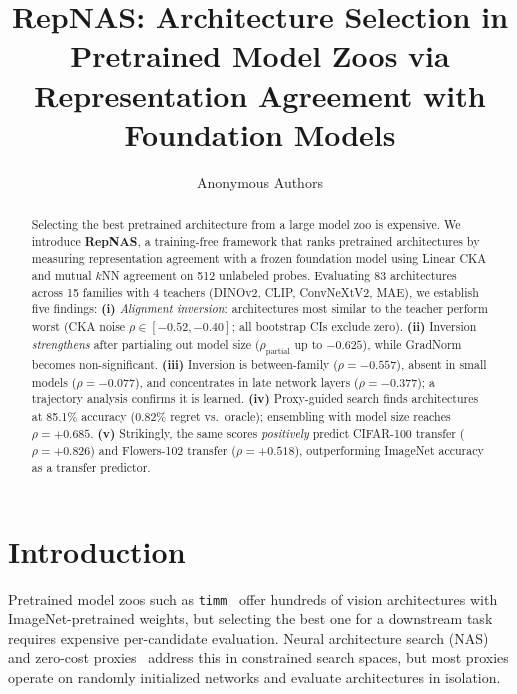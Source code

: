 \documentclass[10pt,twocolumn,letterpaper]{article}
\title{RepNAS: Architecture Selection in Pretrained Model Zoos via Representation Agreement with Foundation Models}
\author{Anonymous Authors}
\begin{document}
\maketitle

\begin{abstract}
Selecting the best pretrained architecture from a large model zoo is expensive.
We introduce \textbf{RepNAS}, a training-free framework that ranks pretrained architectures by measuring representation agreement with a frozen foundation model using Linear CKA and mutual $k$NN agreement on 512 unlabeled probes.
Evaluating 83 architectures across 15 families with 4 teachers (DINOv2, CLIP, ConvNeXtV2, MAE), we establish five findings:
\textbf{(i)} \emph{Alignment inversion}: architectures most similar to the teacher perform worst (CKA noise $\rho \in [-0.52, -0.40]$; all bootstrap CIs exclude zero).
\textbf{(ii)} Inversion \emph{strengthens} after partialing out model size ($\rho_{\text{partial}}$ up to $-0.625$), while GradNorm becomes non-significant.
\textbf{(iii)} Inversion is between-family ($\rho = -0.557$), absent in small models ($\rho = -0.077$), and concentrates in late network layers ($\rho = -0.377$); a trajectory analysis confirms it is learned.
\textbf{(iv)} Proxy-guided search finds architectures at 85.1\% accuracy (0.82\% regret vs.\ oracle); ensembling with model size reaches $\rho = +0.685$.
\textbf{(v)} Strikingly, the same scores \emph{positively} predict CIFAR-100 transfer ($\rho = +0.826$) and Flowers-102 transfer ($\rho = +0.518$), outperforming ImageNet accuracy as a transfer predictor.
\end{abstract}


\section{Introduction}
\label{sec:intro}

Pretrained model zoos such as \texttt{timm}~\cite{rw2019timm} offer hundreds of vision architectures with ImageNet-pretrained weights, but selecting the best one for a downstream task requires expensive per-candidate evaluation.
Neural architecture search (NAS)~\cite{zoph2017nas,liu2019darts} and zero-cost proxies~\cite{mellor2021naswot,tanaka2020synflow,abdelfattah2021zerocost,lee2019snip,wang2020grasp} address this in constrained search spaces, but most proxies operate on randomly initialized networks and evaluate architectures in isolation.
\end{document}
